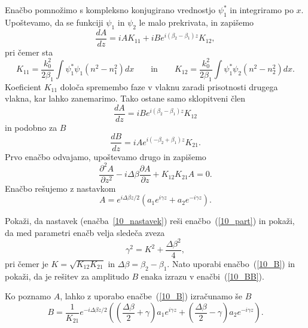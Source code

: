 Enačbo pomnožimo s kompleksno konjugirano vrednostjo $\psi_1^*$ in integriramo po $x$.
Upoštevamo, da se funkciji $\psi_1$ in $\psi_2$ le malo prekrivata, in zapišemo 
\begin{equation}
\frac{dA}{dz} = i A K_{11}+i B e^{i(\beta_2-\beta_1)z} K_{12},
\end{equation}
pri čemer sta
\begin{equation}
K_{11}= \frac{k_0^2}{2 \beta_1}\int\psi_1^*\psi_1 (n^2-n_1^2)dx \qquad \mathrm{in} \qquad 
K_{12}= \frac{k_0^2}{2 \beta_1}\int\psi_1^*\psi_2 (n^2-n_2^2)dx.
\end{equation}
Koeficient $K_{11}$ določa spremembo faze v vlaknu zaradi prisotnosti 
drugega vlakna, kar lahko zanemarimo. Tako ostane samo sklopitveni člen
\begin{equation}
\frac{dA}{dz} = i B e^{i(\beta_2-\beta_1)z} K_{12}
\label{10_B}
\end{equation}
in podobno za $B$
\begin{equation}
\frac{dB}{dz} = i A e^{i(-\beta_2+\beta_1)z} K_{21}.
\end{equation}
Prvo enačbo odvajamo, upoštevamo drugo in zapišemo
\begin{equation}
\frac{\partial^2 A}{\partial z^2}-i \Delta \beta \frac{\partial A}{\partial z} + K_{12}K_{21}A = 0.
\label{10_part}
\end{equation}
Enačbo rešujemo z nastavkom 
\begin{equation}
A = e^{i \Delta \beta z/2}\left( a_1 e^{i \gamma z} + a_2 e^{-i \gamma z}\right).
\label{10_nastavek}
\end{equation}
\begin{definition}
 Pokaži, da  nastavek (enačba~\ref{10_nastavek}) reši enačbo~(\ref{10_part}) in pokaži,
 da med parametri enačb velja sledeča zveza
 \begin{equation}
 \gamma^2 = K^2 + \frac{\Delta \beta ^2}{4},
 \label{10kgamma}
 \end{equation}
 pri čemer je $K = \sqrt{K_{12}K_{21}}$ in $\Delta \beta = \beta_2 - \beta_1$. 
 Nato uporabi enačbo~(\ref{10_B}) in pokaži, da je rešitev za amplitudo $B$
 enaka izrazu v enačbi~(\ref{10_BB}).
\end{definition}
Ko poznamo $A$, lahko z uporabo enačbe~(\ref{10_B}) izračunamo še $B$
\begin{equation}
B = \frac{1}{K_{21}}
e^{-i \Delta \beta z/2}\left(\left(\frac{\Delta \beta}{2} +\gamma \right) a_1 e^{i \gamma z} + 
\left(\frac{\Delta \beta}{2} -\gamma \right)a_2 e^{-i \gamma z}\right).
\label{10_BB}
\end{equation}
